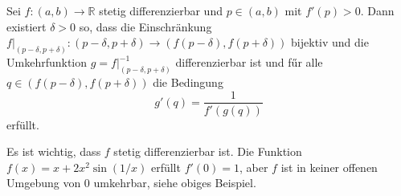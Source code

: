 \documentclass[../main.tex]{subfiles}
\begin{document}
\begin{inverse}
  Sei $f \colon (a, b) \to \mathbb{R}$ stetig
  differenzierbar und $p \in (a, b)$ mit $f'(p) > 0$.
  Dann existiert $\delta > 0$ so, dass
  die Einschränkung $f|_{(p - \delta, p + \delta)}
  \colon (p - \delta, p + \delta) \to
  (f(p - \delta), f(p + \delta))$
  bijektiv und die Umkehrfunktion
  $g = f|_{(p - \delta, p + \delta)}^{-1}$
  differenzierbar ist und fűr alle
  $q \in (f(p-\delta), f(p + \delta))$ die Bedingung
  \[
    g'(q) = \frac{1}{f'(g(q))}
  \]
  erfüllt.
\end{inverse}

\begin{remark}
  Es ist wichtig, dass
  $f$ stetig differenzierbar ist.
  Die Funktion $f(x) = x + 2 x^2 \sin(1/x)$
  erfüllt $f'(0) = 1$, aber  $f$ ist in
  keiner offenen Umgebung von $0$
  umkehrbar, siehe obiges Beispiel.
\end{remark}
\end{document}
